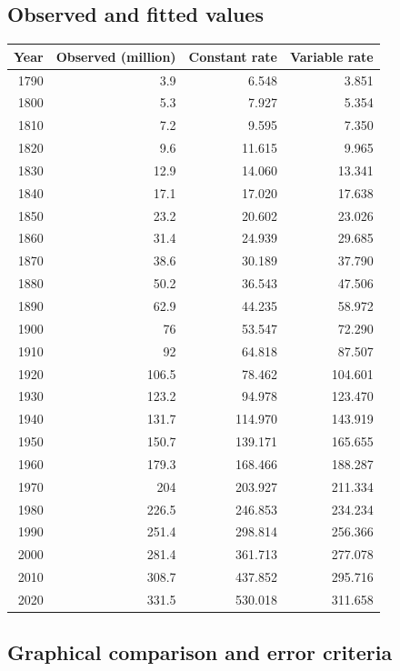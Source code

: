 \documentclass[11pt,a4paper]{article}
\begin{document}
\subsection{Observed and fitted values}
\begin{center}\small
\begin{tabular}{rrrr}\toprule
Year & Observed (million) & Constant rate & Variable rate\\\midrule
1790 & 3.9 & 6.548 & 3.851 \\
1800 & 5.3 & 7.927 & 5.354 \\
1810 & 7.2 & 9.595 & 7.350 \\
1820 & 9.6 & 11.615 & 9.965 \\
1830 & 12.9 & 14.060 & 13.341 \\
1840 & 17.1 & 17.020 & 17.638 \\
1850 & 23.2 & 20.602 & 23.026 \\
1860 & 31.4 & 24.939 & 29.685 \\
1870 & 38.6 & 30.189 & 37.790 \\
1880 & 50.2 & 36.543 & 47.506 \\
1890 & 62.9 & 44.235 & 58.972 \\
1900 & 76 & 53.547 & 72.290 \\
1910 & 92 & 64.818 & 87.507 \\
1920 & 106.5 & 78.462 & 104.601 \\
1930 & 123.2 & 94.978 & 123.470 \\
1940 & 131.7 & 114.970 & 143.919 \\
1950 & 150.7 & 139.171 & 165.655 \\
1960 & 179.3 & 168.466 & 188.287 \\
1970 & 204 & 203.927 & 211.334 \\
1980 & 226.5 & 246.853 & 234.234 \\
1990 & 251.4 & 298.814 & 256.366 \\
2000 & 281.4 & 361.713 & 277.078 \\
2010 & 308.7 & 437.852 & 295.716 \\
2020 & 331.5 & 530.018 & 311.658 \\
\bottomrule\end{tabular}
\end{center}

\clearpage
\subsection{Graphical comparison and error criteria}
\end{document}
